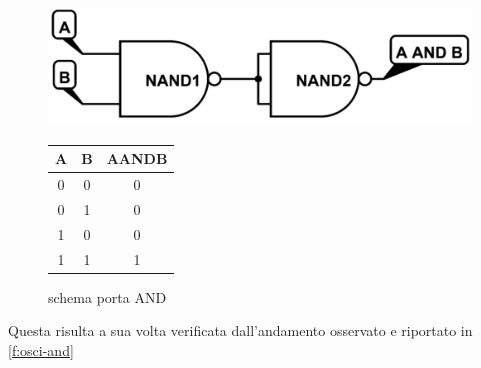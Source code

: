 \begin{figure}[H]
	\begin{minipage}{0.5\textwidth}
		\centering
		\includegraphics[scale=0.22]{../Figs-Tabs/AND_.png}
		\caption{schema porta AND}
		\label{f:AND}
	\end{minipage}
	\begin{minipage}{0.5\textwidth}
		\centering
		\begin{tabular}{ccc}
			\toprule
			A & B & A\;AND\;B	\\
			\midrule
			0  & 0 & 0\\
			0  & 1 & 0\\
			1  & 0 & 0\\
			1  & 1 & 1\\
			\bottomrule
		\end{tabular}
		\label{t:AND}
	\end{minipage}
\end{figure}
	
Questa risulta a sua volta verificata dall'andamento osservato e riportato in \figurename{ \ref{f:osci-and}}
	
